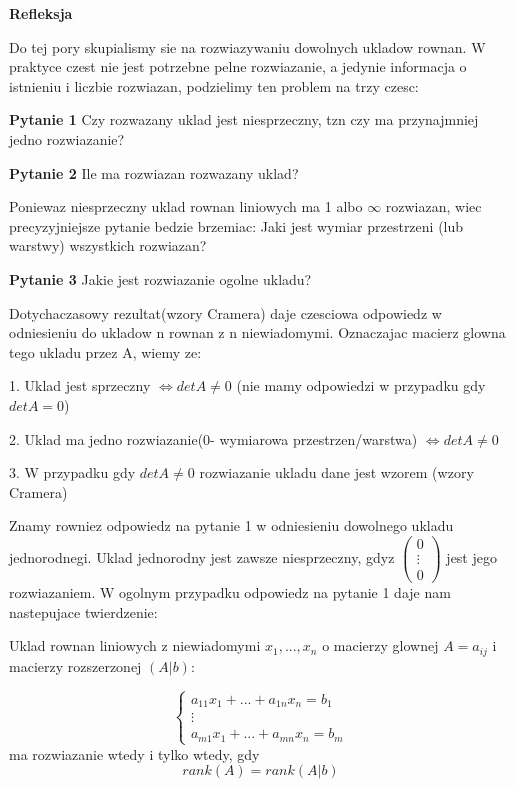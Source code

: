 \documentclass{article}
\begin{document}
\textbf{Refleksja}

Do tej pory skupialismy sie na rozwiazywaniu dowolnych ukladow rownan. W praktyce czest nie jest potrzebne pelne rozwiazanie, a jedynie informacja o istnieniu i liczbie rozwiazan, podzielimy ten problem na trzy czesc:

\textbf{Pytanie 1} Czy rozwazany uklad jest niesprzeczny, tzn czy ma przynajmniej jedno rozwiazanie?

\textbf{Pytanie 2} Ile ma rozwiazan rozwazany uklad? 

Poniewaz niesprzeczny uklad rownan liniowych ma 1 albo $\infty$ rozwiazan, wiec precyzyjniejsze pytanie bedzie brzemiac: Jaki jest wymiar przestrzeni (lub warstwy) wszystkich rozwiazan?

\textbf{Pytanie 3} Jakie jest rozwiazanie ogolne ukladu?

Dotychaczasowy rezultat(wzory Cramera) daje czesciowa odpowiedz w odniesieniu do ukladow n rownan z n niewiadomymi. Oznaczajac macierz glowna tego ukladu przez A, wiemy ze:

1. Uklad jest sprzeczny $\iff detA \neq 0$ (nie mamy odpowiedzi w przypadku gdy $detA = 0$)

2. Uklad ma jedno rozwiazanie(0- wymiarowa przestrzen/warstwa) $\iff detA \neq 0$

3. W przypadku gdy $detA \neq 0$ rozwiazanie ukladu dane jest wzorem (wzory Cramera)

Znamy rowniez odpowiedz na pytanie 1 w odniesieniu dowolnego ukladu jednorodnegi. Uklad jednorodny jest zawsze niesprzeczny, gdyz $ \begin{pmatrix} 0 \\  \vdots \\ 0 \end{pmatrix}$ jest jego rozwiazaniem. W ogolnym przypadku odpowiedz na pytanie 1 daje nam nastepujace twierdzenie:


 \begin{tcolorbox}[colback=white!90!blue,colframe=black!35!blue,title=Twierdzenie Kroneckera-Capellego v1]

Uklad rownan liniowych z niewiadomymi $x_{1},...,x_{n}$ o macierzy glownej $A = a_{ij}$ i macierzy rozszerzonej $(A|b)$:

$$ \begin{cases}
a_{11}x_{1} + ... + a_{1n}x_{n} = b_{1} \\
\vdots \\
a_{m1}x_{1} + ... + a_{mn}x_{n} = b_{m}
\end{cases} $$
ma rozwiazanie wtedy i tylko wtedy, gdy
$$
rank(A) = rank(A|b)
$$
 
 \end{tcolorbox}
\end{document}
